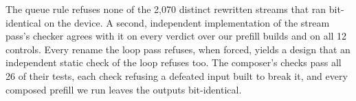 The queue rule refuses none of the 2{,}070 distinct rewritten streams that ran bit-identical on the device.
A second, independent implementation of the stream pass's checker agrees with it on every verdict over our prefill builds and on all 12 controls.
Every rename the loop pass refuses, when forced, yields a design that an independent static check of the loop refuses too.
The composer's checks pass all 26 of their tests, each check refusing a defeated input built to break it, and every composed prefill we run leaves the outputs bit-identical.
